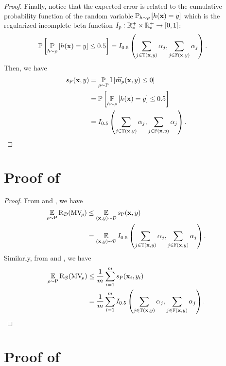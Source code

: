 \begin{noaddcontents}
\begin{proof}
Finally, notice that the expected error is related to the cumulative probability function of the random variable $\operatorname*{\mathbb{P}}_{h\sim\rho}\left[ h(\mathbf{x}) = y\right]$ which is the regularized incomplete beta function $I_p: \mathbb{R}^{+}_{*} \times \mathbb{R}^{+}_{*} \to [0, 1]$:
\begin{align*}
    \operatorname*{\mathbb{P}}\left[ \operatorname*{\mathbb{P}}_{h\sim\rho}\left[ h(\mathbf{x}) = y\right] \le 0.5\right] &= I_{0.5}\left(\sum_{j \in \mathbb{T}(\mathbf{x}, y)} \alpha_j, \sum_{j \in \mathbb{F}(\mathbf{x}, y)} \alpha_j\right).
\end{align*}
Then, we have 
\begin{align*}
    s_{\mathrm{P}}(\mathbf{x}, y) &= \operatorname*{\mathbb{P}}_{\rho\sim\mathrm{P}} \operatorname{I}\left[ \widehat{m_{\rho}}(\mathbf{x}, y) \le 0\right]\\
    &= \operatorname*{\mathbb{P}}\left[ \operatorname*{\mathbb{P}}_{h\sim\rho}\left[ h(\mathbf{x}) = y\right] \le 0.5\right]\\
    &= I_{0.5}\left(\sum_{j \in \mathbb{T}(\mathbf{x}, y)} \alpha_j, \sum_{j \in \mathbb{F}(\mathbf{x}, y)} \alpha_j\right).
\end{align*}
\end{proof}

\section{Proof of }
\label{chap:mv-sto:sec:proof-corollary-risk}

\corollaryrisk*
\begin{proof}
From  and , we have
\begin{align*}
    \operatorname*{\mathbb{E}}_{\rho\sim\mathrm{P}}\text{R}_{\mathcal{D}}(\text{MV}_{\!\rho}) &\le \operatorname*{\mathbb{E}}_{(\mathbf{x},y)\sim\mathcal{D}}s_{\mathrm{P}}(\mathbf{x},y)\\
    &= \operatorname*{\mathbb{E}}_{(\mathbf{x},y)\sim\mathcal{D}} I_{0.5}\left(\sum_{j \in \mathbb{T}(\mathbf{x},y)} \alpha_j, \sum_{j \in \mathbb{F}(\mathbf{x},y)} \alpha_j\right).
\end{align*}
Similarly, from  and , we have
\begin{align*}
    \operatorname*{\mathbb{E}}_{\rho\sim\mathrm{P}}\text{R}_{\mathcal{S}}(\text{MV}_{\!\rho}) &\le \frac{1}{m}\sum_{i=1}^{m}s_{\mathrm{P}}(\mathbf{x}_i,y_i)\\
    &= \frac{1}{m}\sum_{i=1}^m I_{0.5}\left(\sum_{j \in \mathbb{T}(\mathbf{x},y)} \alpha_j, \sum_{j \in \mathbb{F}(\mathbf{x},y)} \alpha_j\right).
\end{align*}
\end{proof}

\section{Proof of }
\label{chap:mv-sto:sec:proof-theorem-bound}


\end{noaddcontents}
